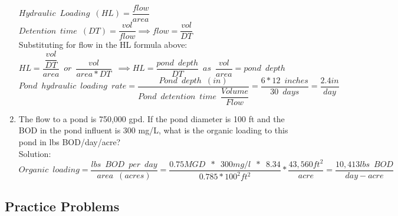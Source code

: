 \begin{enumerate}
$Hydraulic \enspace Loading \enspace (HL)=\dfrac{flow}{area}$\\
$Detention \enspace time \enspace (DT)=\dfrac{vol}{flow} \implies flow=\dfrac{vol}{DT} $\\
Substituting \enspace for \enspace flow \enspace in \enspace the HL \enspace formula above:\\
$HL=\dfrac{\dfrac{vol}{DT}}{area}\enspace or \enspace \dfrac{vol}{area*DT} \enspace \implies \boxed{HL=\dfrac{pond \enspace depth}{DT}} \enspace as \enspace \dfrac{vol}{area}=pond \enspace depth$\\

$Pond \enspace hydraulic \enspace loading \enspace rate=\dfrac{Pond \enspace depth \enspace (in)}{Pond \enspace detention  \enspace time \enspace \dfrac{Volume}{Flow}}=\dfrac{6*12 \enspace inches}{30 \enspace days}=\boxed{\dfrac{2.4in}{day}}$\\
\vspace{0.5cm}

\item The flow to a pond is 750,000 gpd. If the pond diameter is 100 ft and the BOD in the pond influent is 300 mg/L, what is the organic loading to this pond in lbs BOD/day/acre?
\\
Solution:\\
$Organic \enspace loading=\dfrac{lbs \enspace BOD \enspace per \enspace day}{area \enspace (acres)}=\dfrac{0.75MGD \enspace * \enspace 300mg/l \enspace * \enspace 8.34}{0.785*100^2ft^2}*\dfrac{43,560ft^2}{acre}=\boxed{\dfrac{10,413lbs \enspace BOD}{day-acre}}$
\end{enumerate}

\subsection{Practice Problems} 

